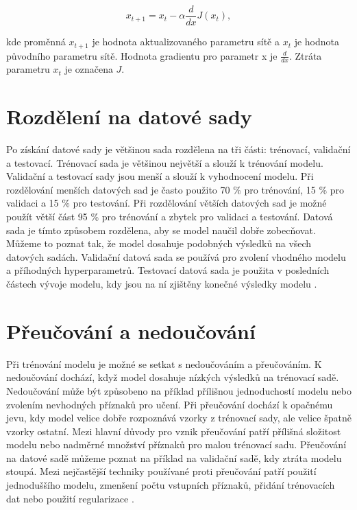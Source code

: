 \documentclass[FM,BP]{tulthesis}
\begin{document}
\begin{equation}
\label{eqn:gradient_descent}
x_{t+1} = x_t - \alpha \frac{d}{dx}J(x_t),
\end{equation}

kde proměnná $ x_{t+1} $ je hodnota aktualizovaného parametru sítě a $ x_t $ je hodnota původního parametru sítě. Hodnota gradientu pro parametr x je $ \frac{d}{dx} $. Ztráta parametru $ x_t $ je označena $ J $.

\section{Rozdělení na datové sady} %
Po získání datové sady je většinou sada rozdělena na tři části: trénovací, validační a testovací. Trénovací sada je většinou největší a slouží k trénování modelu. Validační a testovací sady jsou menší a slouží k vyhodnocení modelu. Při rozdělování menších datových sad je často použito 70 \% pro trénování, 15 \% pro validaci a 15 \% pro testování. Při rozdělování větších datových sad je možné použít větší část 95 \% pro trénování a zbytek pro validaci a testování. Datová sada je tímto způsobem rozdělena, aby se model naučil dobře zobecňovat. Můžeme to poznat tak, že model dosahuje podobných výsledků na všech datových sadách. Validační datová sada se používá pro zvolení vhodného modelu a příhodných hyperparametrů. Testovací datová sada je použita v posledních částech vývoje modelu, kdy jsou na ní zjištěny konečné výsledky modelu \cite{burkov2019hundred}.

\section{Přeučování a nedoučování} %
Při trénování modelu je možné se setkat s nedoučováním a přeučováním. K nedoučování dochází, když model dosahuje nízkých výsledků na trénovací sadě. Nedoučování může být způsobeno na příklad přílišnou jednoduchostí modelu nebo zvolením nevhodných příznaků pro učení. Při přeučování dochází k opačnému jevu, kdy model velice dobře rozpoznává vzorky z trénovací sady, ale velice špatně vzorky ostatní. Mezi hlavní důvody pro vznik přeučování patří přílišná složitost modelu nebo nadměrné množství příznaků pro malou trénovací sadu. Přeučování na datové sadě můžeme poznat na příklad na validační sadě, kdy ztráta modelu stoupá. Mezi nejčastější techniky používané proti přeučování patří použití jednoduššího modelu, zmenšení počtu vstupních příznaků, přidání trénovacích dat nebo použití regularizace \cite{burkov2019hundred}.
\end{document}

